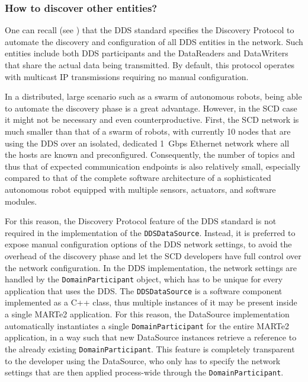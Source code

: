 \subsubsection{How to discover other entities?}
\label{sec:ddsdatasource_discovery}
One can recall (see ) that the DDS standard specifies the Discovery Protocol to automate the discovery and configuration of all DDS entities in the network. Such entities include both DDS participants and the DataReaders and DataWriters that share the actual data being transmitted. By default, this protocol operates with multicast IP transmissions requiring no manual configuration.

In a distributed, large scenario such as a swarm of autonomous robots, being able to automate the discovery phase is a great advantage. However, in the SCD case it might not be necessary and even counterproductive. First, the SCD network is much smaller than that of a swarm of robots, with currently 10 nodes that are using the DDS over an isolated, dedicated \SI{1}{Gbps} Ethernet network where all the hosts are known and preconfigured. Consequently, the number of topics and thus that of expected communication endpoints is also relatively small, especially compared to that of the complete software architecture of a sophisticated autonomous robot equipped with multiple sensors, actuators, and software modules.

For this reason, the Discovery Protocol feature of the DDS standard is not required in the implementation of the \texttt{DDSDataSource}. Instead, it is preferred to expose manual configuration options of the DDS network settings, to avoid the overhead of the discovery phase and let the SCD developers have full control over the network configuration. In the DDS implementation, the network settings are handled by the \texttt{DomainParticipant} object, which has to be unique for every application that uses the DDS. The \texttt{DDSDataSource} is a software component implemented as a C++ class, thus multiple instances of it may be present inside a single MARTe2 application. For this reason, the DataSource implementation automatically instantiates a single \texttt{DomainParticipant} for the entire MARTe2 application, in a way such that new DataSource instances retrieve a reference to the already existing \texttt{DomainParticipant}. This feature is completely transparent to the developer using the DataSource, who only has to specify the network settings that are then applied process-wide through the \texttt{DomainParticipant}.

